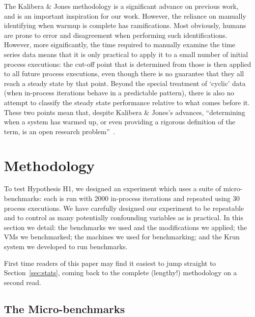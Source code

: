 \documentclass[acmlarge]{acmart}\settopmatter{printfolios=true}
\newcommand{\kalibera}{Kalibera \& Jones\xspace}
\newcommand{\krun}{Krun\xspace}
\newcommand{\hypone}{H1\xspace}
\newcommand{\numpexecs}{30\xspace}
\newcommand{\numiterations}{2000\xspace}
\begin{document}
The \kalibera methodology is a significant advance on previous work,
and is an important inspiration for our work. However, the reliance
on manually identifying when warmup is complete has ramifications. Most
obviously, humans are prone to error and disagreement when performing
such identifications. However, more significantly, the time required
to manually examine the time series data means that it is only practical to apply it to a small number
of initial process executions: the cut-off point that is determined from those
is then applied to all future process executions, even though there is no
guarantee that they all reach a steady state by that point. Beyond the
special treatment of `cyclic' data (when in-process iterations behave in a
predictable pattern), there is also no attempt to classify the steady state
performance relative to what comes before it. These two points mean that,
despite \kalibera's advances,
``determining when a system has warmed up, or even providing a
rigorous definition of the term, is an open research problem''~\cite{seaton15phd}.


\section{Methodology}
\label{sec:methodology}

To test Hypothesis \hypone, we designed an experiment which uses a suite of
micro-benchmarks: each is run with \numiterations in-process iterations and repeated
using \numpexecs process executions. We have carefully designed our
experiment to be repeatable and to control as many potentially confounding variables as
is practical. In this section we detail: the benchmarks we used and the modifications we
applied; the VMs we benchmarked; the machines we used for benchmarking; and the
\krun system we developed to run benchmarks.

First time readers of this paper may find it easiest to jump straight to
Section~\ref{sec:stats}, coming back to the complete (lengthy!) methodology
on a second read.


\subsection{The Micro-benchmarks}
\label{sec:microbenchmarks}
\end{document}
